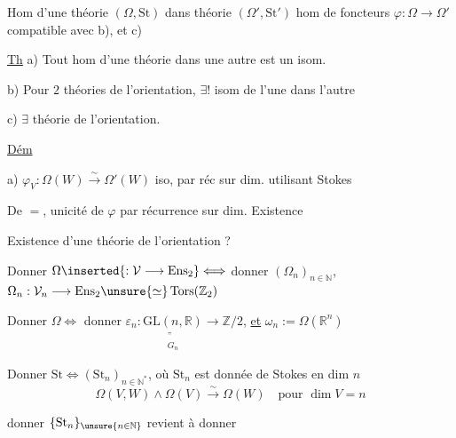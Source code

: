  Hom d'une théorie $(\Omega,\mathrm{St})$ dans théorie $(\Omega',\mathrm{St}')$ hom de foncteurs $\varphi:\Omega\longrightarrow\Omega'$ compatible avec b), et c)

\uline{Th}\quad {} a) Tout hom d'une théorie dans une autre est un isom.

b) Pour $2$ théories de l'orientation, $\exists!$ isom de l'une dans l'autre

c) $\exists$ théorie de l'orientation.

\uline{Dém}

a) $\varphi_V:\Omega(W)\xrightarrow{\sim}\Omega'(W)$ iso, par réc sur dim. utilisant Stokes

De $=$, unicité de $\varphi$ par récurrence sur dim. Existence 


  Existence d'une théorie de l'orientation ?

Donner $\Omega\inserted{:\mathcal V\longrightarrow\mathrm{Ens}_2}\Longleftrightarrow$ donner $(\Omega_n)_{n\in\mathbb{N}}$, $\Omega_n:\mathcal V_n\longrightarrow\mathrm{Ens}_2\unsure{\simeq}\operatorname{Tors}(\mathbb{Z}_2)$

Donner $\Omega\Longleftrightarrow$ donner $\varepsilon_n:\underset{\substack{\text{''}\\G_n}}{\mathrm{GL}(n,\mathbb{R})}\longrightarrow\mathbb{Z}/2$, \uline{et} $\omega_n:=\Omega(\mathbb{R}^n)$

Donner $\mathrm{St}\Longleftrightarrow(\mathrm{St}_n)_{n\in\mathbb{N}^*}$, où $\mathrm{St}_n$ est donnée de Stokes en dim $n$
\[
\Omega(V,W)\wedge\Omega(V)\xrightarrow{\sim}\Omega(W)\quad\text{pour }\dim V=n
\]

donner $\{\mathrm{St}_n\}_{\unsure{n\in\mathbb{N}}}$ revient à donner
